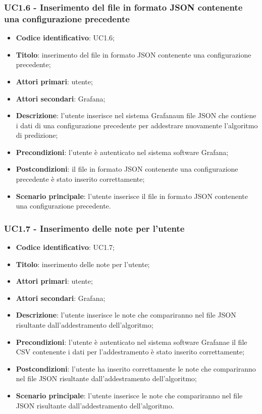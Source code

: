 \subsubsection{UC1.6 - Inserimento del file in formato JSON contenente una configurazione precedente}
\begin{itemize}
	\item \textbf{Codice identificativo}: UC1.6;
	\item \textbf{Titolo}: inserimento del file in formato JSON contenente una configurazione precedente;
	\item \textbf{Attori primari}: utente;
	\item \textbf{Attori secondari}: Grafana\glo;
	\item \textbf{Descrizione}: l'utente inserisce nel sistema Grafana\glosp un file JSON che contiene i dati di una configurazione precedente per addestrare nuovamente l'algoritmo di predizione;
	\item \textbf{Precondizioni}: l'utente è autenticato nel sistema software Grafana\glo;
	\item \textbf{Postcondizioni}: il file in formato JSON contenente una configurazione precedente è stato inserito correttamente;
	\item \textbf{Scenario principale}: l'utente inserisce il file in formato JSON contenente una configurazione precedente.
\end{itemize}
\subsubsection{UC1.7 - Inserimento delle note per l'utente}
\begin{itemize}
	\item \textbf{Codice identificativo}: UC1.7;
	\item \textbf{Titolo}: inserimento delle note per l'utente;
	\item \textbf{Attori primari}: utente;
	\item \textbf{Attori secondari}: Grafana\glo;
	\item \textbf{Descrizione}: l'utente inserisce le note che compariranno nel file JSON risultante dall'addestramento dell'algoritmo;
	\item \textbf{Precondizioni}: l'utente è autenticato nel sistema software Grafana\glosp e il file CSV contenente i dati per l'addestramento è stato inserito correttamente;
	\item \textbf{Postcondizioni}: l'utente ha inserito correttamente le note che compariranno nel file JSON risultante dall'addestramento dell'algoritmo;
	\item \textbf{Scenario principale}: l'utente inserisce le note che compariranno nel file JSON risultante dall'addestramento dell'algoritmo.
\end{itemize}
